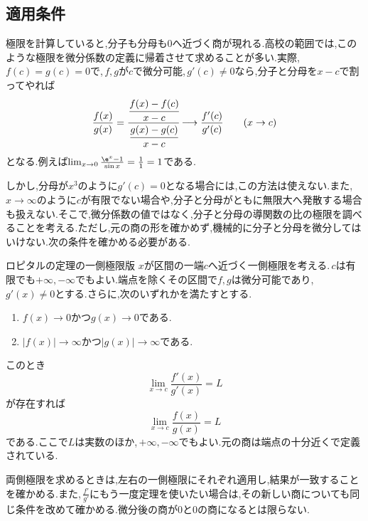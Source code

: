 \subsection{適用条件}

極限を計算していると,分子も分母も$0$へ近づく商が現れる.高校の範囲では,このような極限を微分係数の定義に帰着させて求めることが多い.実際,\,$f(c)=g(c)=0$で,\,$f,g$が$c$で微分可能,\,$g'(c)\ne0$なら,分子と分母を$x-c$で割ってやれば
\[
 \frac{f(x)}{g(x)}
 =\cfrac{\cfrac{f(x)-f(c)}{x-c}}{\cfrac{g(x)-g(c)}{x-c}}
 \longrightarrow\frac{f'(c)}{g'(c)}
 \qquad(x\to c)
\]
となる.例えば$\lim_{x\to0}\frac{\e^x-1}{\sin x}=\frac11=1$である.

しかし,分母が$x^3$のように$g'(c)=0$となる場合には,この方法は使えない.また,\,$x\to\infty$のように$c$が有限でない場合や,分子と分母がともに無限大へ発散する場合も扱えない.そこで,微分係数の値ではなく,分子と分母の導関数の比の極限を調べることを考える.ただし,元の商の形を確かめず,機械的に分子と分母を微分してはいけない.次の条件を確かめる必要がある.

\begin{theorem}{ロピタルの定理の一側極限版}
$x$が区間の一端$c$へ近づく一側極限を考える.\,$c$は有限でも$+\infty,-\infty$でもよい.端点を除くその区間で$f,g$は微分可能であり,\,$g'(x)\ne0$とする.さらに,次のいずれかを満たすとする.
\begin{enumerate}[label=(\roman*),leftmargin=*]
 \item $f(x)\to0$かつ$g(x)\to0$である.
 \item $|f(x)|\to\infty$かつ$|g(x)|\to\infty$である.
\end{enumerate}
このとき
\[
 \lim_{x\to c}\frac{f'(x)}{g'(x)}=L
\]
が存在すれば
\[
 \lim_{x\to c}\frac{f(x)}{g(x)}=L
\]
である.ここで$L$は実数のほか,\,$+\infty,-\infty$でもよい.元の商は端点の十分近くで定義されている.
\end{theorem}

両側極限を求めるときは,左右の一側極限にそれぞれ適用し,結果が一致することを確かめる.また,\,$\frac{f'}{g'}$にもう一度定理を使いたい場合は,その新しい商についても同じ条件を改めて確かめる.微分後の商が$0$と$0$の商になるとは限らない.

